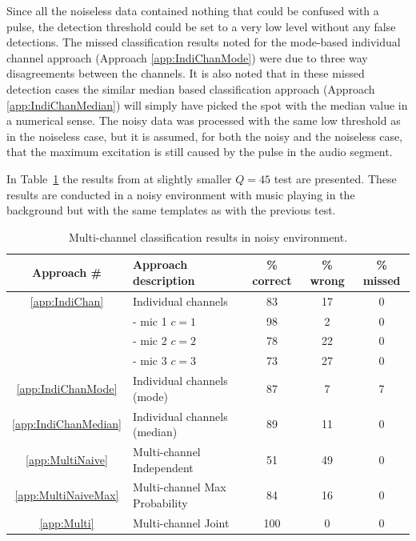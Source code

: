 Since all the noiseless data contained nothing that could be confused with a pulse, the detection threshold could be set to a very low level without any false detections. The missed classification results noted for the mode-based individual channel approach (Approach \ref{app:IndiChanMode}) were due to three way disagreements between the channels. It is also noted that in these missed detection cases the similar median based classification approach (Approach \ref{app:IndiChanMedian}) will simply have picked the spot with the median value in a numerical sense. The noisy data was processed with the same low threshold as in the noiseless case, but it is assumed, for both the noisy and the noiseless case, that the maximum excitation is still caused by the pulse in the audio segment.

In Table~\ref{tab:multiAPRresultsNoise} the results from at slightly smaller $Q=45$ test are presented. These results are conducted in a noisy environment with music playing in the background but with the same templates as with the previous test.

\begin{table}\begin{center}
\caption{Multi-channel classification results in noisy environment.}
\label{tab:multiAPRresultsNoise}
\begin{tabular}{|c|l|c|c|c|}\hline
Approach \#             & Approach description          & \% correct    & \% wrong  & \%  missed  \\ \hline
\ref{app:IndiChan}      & Individual channels           & 83            & 17        & 0           \\
                        &  - mic 1 $c = 1$              & 98            & 2         & 0           \\
                        &  - mic 2 $c = 2$              & 78            & 22        & 0           \\
                        &  - mic 3 $c = 3$              & 73            & 27        & 0           \\
\ref{app:IndiChanMode}  & Individual channels (mode)    & 87            & 7         & 7           \\
\ref{app:IndiChanMedian}& Individual channels (median)  & 89            & 11        & 0           \\
\ref{app:MultiNaive}    & Multi-channel Independent     & 51            & 49        & 0           \\
\ref{app:MultiNaiveMax} & Multi-channel Max Probability & 84            & 16        & 0           \\
\ref{app:Multi}         & Multi-channel Joint           & 100           & 0         & 0           \\ \hline
\end{tabular}\end{center}\end{table}


